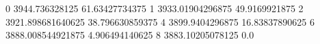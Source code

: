 0 3944.736328125 61.63427734375
1 3933.01904296875 49.9169921875
2 3921.898681640625 38.796630859375
4 3899.9404296875 16.83837890625
6 3888.008544921875 4.906494140625
8 3883.10205078125 0.0
